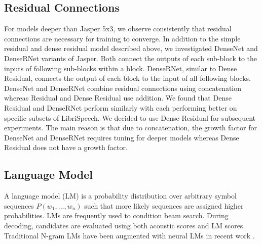 \documentclass[a4paper]{article}
\begin{document}
\subsection{Residual Connections}
For models deeper than Jasper 5x3, we observe consistently that residual connections are necessary for training to converge. In addition to the simple residual and dense residual model described above, we investigated DenseNet \cite{huang2016} and DenseRNet \cite{Tang2018} variants of Jasper. Both connect the outputs of each sub-block to the inputs of following sub-blocks within a block. DenseRNet, similar to Dense Residual, connects the output of each block to the input of all following blocks. DenseNet and DenseRNet combine residual connections using concatenation whereas Residual and Dense Residual use addition. We found that Dense Residual and DenseRNet perform similarly with each performing better on specific subsets of LibriSpeech. We decided to use Dense Residual for subsequent experiments. The main reason is that due to concatenation, the growth factor for DenseNet and DenseRNet requires tuning for deeper models whereas Dense Residual does not have a growth factor.

\begin{table}[th]
\centering
\caption{Residual Connections: Greedy WER, LibriSpeech for Jasper 10x3 after 400 epochs.  All models sized to have roughly the same parameter count.}
\label{tab:Res}
\end{table}

\subsection{Language Model}
A language model (LM) is a probability distribution over arbitrary symbol sequences $P(w_1, ..., w_n)$ such that more likely sequences are assigned higher probabilities. LMs are frequently used to condition beam search. During decoding, candidates are evaluated using both acoustic scores and LM scores. Traditional N-gram LMs have been augmented with neural LMs in recent work \cite{zeyer2018improved, Povey2018SemiOrthogonalLM, CAPIO2017}.
\end{document}
